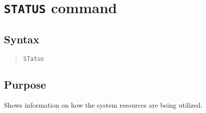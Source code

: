 %
%
%
%
\section{{\tt STATUS} command}
\subsection{Syntax}
\begin{verse}{\tt STatus}
\end{verse}
\subsection{Purpose}

Shows information on how the system resources are being utilized.
